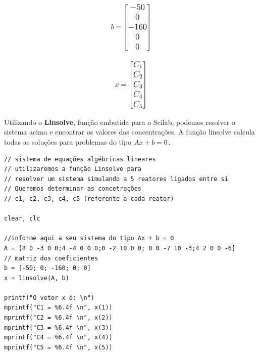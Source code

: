 $$\large b = \begin{bmatrix} -50 \\ 0 \\ -160 \\ 0 \\ 0 \end{bmatrix}$$

$$\large x = \begin{bmatrix} C_{1} \\ C_{2} \\ C_{3} \\ C_{4} \\ C_{5} \end{bmatrix}$$

Utilizando o \textbf{Linsolve}, função embutida para o Scilab, podemos resolver o sistema acima e encontrar os valores das concentrações. A função linsolve calcula todas as soluções para problemas do tipo $\large Ax + b = 0$.

\begin{verbatim}
// sistema de equações algébricas lineares
// utilizaremos a função Linsolve para 
// resolver um sistema simulando a 5 reatores ligados entre si
// Queremos determinar as concetrações 
// c1, c2, c3, c4, c5 (referente a cada reator)

clear, clc

//informe aqui a seu sistema do tipo Ax + b = 0
A = [8 0 -3 0 0;4 -4 0 0 0;0 -2 10 0 0; 0 0 -7 10 -3;4 2 0 0 -6] 
// matriz dos coeficientes
b = [-50; 0; -160; 0; 0] 
x = linsolve(A, b)

printf("O vetor x é: \n")
mprintf("C1 = %6.4f \n", x(1))
mprintf("C2 = %6.4f \n", x(2))
mprintf("C3 = %6.4f \n", x(3))
mprintf("C4 = %6.4f \n", x(4))
mprintf("C5 = %6.4f \n", x(5))
\end{verbatim}